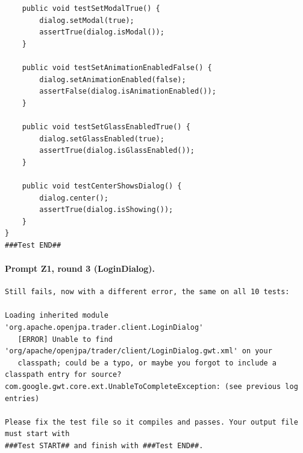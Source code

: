\begin{lstlisting}
    public void testSetModalTrue() {
        dialog.setModal(true);
        assertTrue(dialog.isModal());
    }

    public void testSetAnimationEnabledFalse() {
        dialog.setAnimationEnabled(false);
        assertFalse(dialog.isAnimationEnabled());
    }

    public void testSetGlassEnabledTrue() {
        dialog.setGlassEnabled(true);
        assertTrue(dialog.isGlassEnabled());
    }

    public void testCenterShowsDialog() {
        dialog.center();
        assertTrue(dialog.isShowing());
    }
}
###Test END##
\end{lstlisting}

\paragraph*{Prompt Z1, round 3 (LoginDialog).}
\label{prompt:ld-z1-r3}
\begin{lstlisting}
Still fails, now with a different error, the same on all 10 tests:

Loading inherited module 'org.apache.openjpa.trader.client.LoginDialog'
   [ERROR] Unable to find 'org/apache/openjpa/trader/client/LoginDialog.gwt.xml' on your
   classpath; could be a typo, or maybe you forgot to include a classpath entry for source?
com.google.gwt.core.ext.UnableToCompleteException: (see previous log entries)

Please fix the test file so it compiles and passes. Your output file must start with
###Test START## and finish with ###Test END##.
\end{lstlisting}


